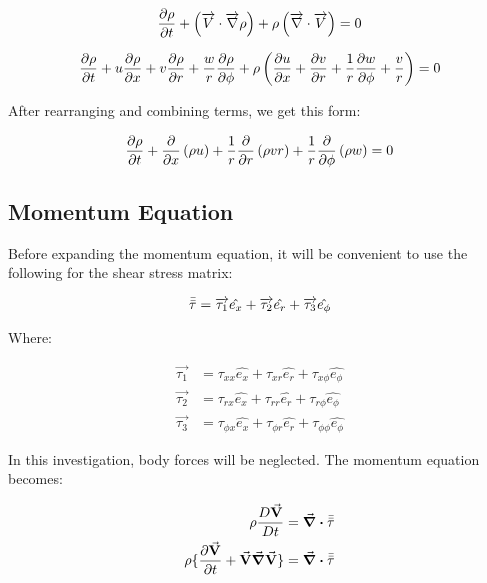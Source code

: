 \begin{equation}
  \pdv{\rho}{t} 
  + \left(\overrightarrow{V}\cdot\overrightarrow{\nabla}\rho\right)
  + \rho\left(\overrightarrow{\nabla}\cdot\overrightarrow{V}\right) = 0
\end{equation}

\begin{equation}
  \pdv{\rho}{t}  
  + u\pdv{\rho}{x}
  + v\pdv{\rho}{r} 
  + \frac{w}{r}\pdv{\rho}{\phi}
  + \rho\left(\pdv{u}{x}
  + \pdv{v}{r} 
  + \frac{1}{r}\pdv{w}{\phi} 
  + \frac{v}{r} \right) = 0
\end{equation}

After rearranging and combining terms, we get this form:

\begin{equation}
  \pdv{\rho}{t}
  + \pdv{x}\left(\rho u\right)
  + \frac{1}{r}\pdv{r}\left(\rho v r \right)
  + \frac{1}{r}\pdv{\phi}\left(\rho w\right) = 0
\end{equation}

\subsection{Momentum Equation}

Before expanding the momentum equation, it will be convenient to use the following for the shear stress matrix:

\begin{equation}
  \bar{\bar{\tau}} 
  = \overrightarrow{\tau_1}\hat{e_x} 
  + \overrightarrow{\tau_2}\hat{e_r}
  + \overrightarrow{\tau_3}\hat{e_\phi}
\end{equation}

Where:

\begin{equation}
  \begin{aligned}
    \overrightarrow{\tau_1} 
    &= \tau_{xx}\hat{e_x}
    + \tau_{xr}\hat{e_r}
    + \tau_{x\phi}\hat{e_\phi} \\
     \overrightarrow{\tau_2} 
    &= \tau_{rx}\hat{e_x}
    + \tau_{rr}\hat{e_r}
    + \tau_{r\phi}\hat{e_\phi} \\
     \overrightarrow{\tau_3} 
    &= \tau_{\phi x}\hat{e_x}
    + \tau_{\phi r}\hat{e_r}
    + \tau_{\phi\phi}\hat{e_\phi}
  \end{aligned}
\end{equation}

In this investigation, body forces will be neglected. The momentum equation becomes:

\begin{equation}
  \begin{aligned}
    \rho\frac{D\va{V}}{Dt}
    &= \div\bar{\bar{\tau}} \\
    \rho 
    \{
      \pdv{\va{V}}{t} 
      +  \va{V}\grad\va{V}
    \} 
    &= \div{\bar{\bar{\tau}}}
  \end{aligned}
\end{equation}

